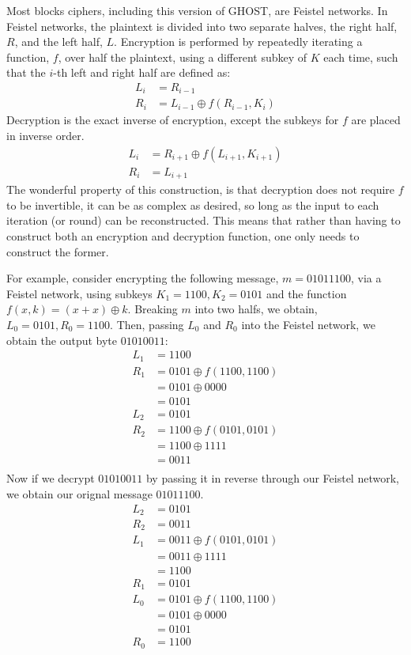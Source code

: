 \documentclass[12pt, a4paper, final]{report}
\begin{document}
Most blocks ciphers, including this version of GHOST, are Feistel networks.
In Feistel networks, the plaintext is divided into two separate halves, the
right half, $R$, and the left half, $L$. Encryption is performed by
repeatedly iterating a function, $f$, over half the plaintext, using a
different subkey of $K$ each time, such that the $i$-th left and right half
are defined as:
\begin{align*}
    L_i & = R_{i - 1}\\
    R_i & = L_{i - 1} \oplus f(R_{i - 1}, K_i)
\end{align*}
Decryption is the exact inverse of encryption, except the subkeys for $f$ are
placed in inverse order.
\begin{align*}
    L_i & = R_{i + 1} \oplus f(L_{i + 1}, K_{i + 1})\\
    R_i & = L_{i + 1}
\end{align*}
The wonderful property of this construction, is that decryption does not
require $f$ to be invertible, it can be as complex as desired, so long as
the input to each iteration (or round) can be reconstructed. This means
that rather than having to construct both an encryption and decryption
function, one only needs to construct the former.

For example, consider encrypting the following message, $m = 01011100$, via
a Feistel network, using subkeys $K_1 = 1100, K_2 = 0101$ and the function
$f(x, k) = (x + x) \oplus k$. Breaking $m$ into two halfs, we obtain,
$L_0 = 0101, R_0 = 1100$. Then, passing $L_0$ and $R_0$ into the Feistel
network, we obtain the output byte $01010011$:
\begin{align*}
    L_1 &= 1100\\
    R_1 &= 0101 \oplus f(1100, 1100)\\
        &= 0101 \oplus 0000\\
        &= 0101\\
    L_2 &= 0101\\
    R_2 &= 1100 \oplus f(0101, 0101)\\
        &= 1100 \oplus 1111\\
        &= 0011\\
\end{align*}
Now if we decrypt $01010011$ by passing it in reverse through our
Feistel network, we obtain our orignal message $01011100$.
\begin{align*}
    L_2 &= 0101\\
    R_2 &= 0011\\
    L_1 &= 0011 \oplus f(0101, 0101)\\
        &= 0011 \oplus 1111\\
        &= 1100\\
    R_1 &= 0101\\
    L_0 &= 0101 \oplus f(1100, 1100)\\
        &= 0101 \oplus 0000\\
        &= 0101\\
    R_0 &= 1100
\end{align*}
\end{document}
